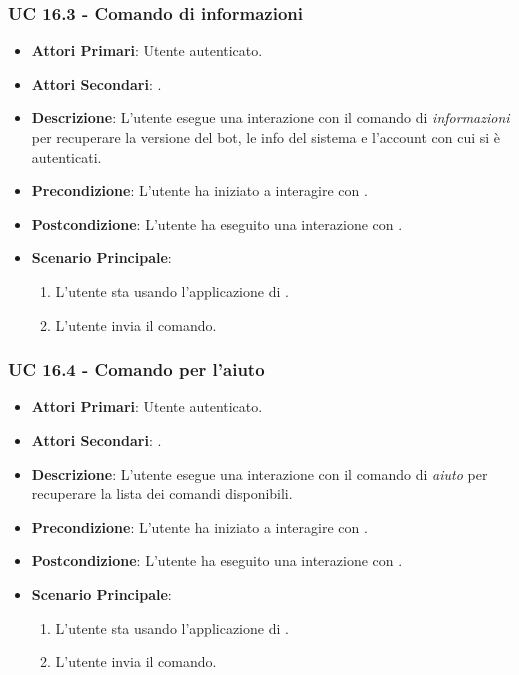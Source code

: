 	\subsubsection{UC 16.3 - Comando di informazioni}

	\begin{itemize}
		\item \textbf{Attori Primari}: Utente autenticato.
		\item \textbf{Attori Secondari}: .
		\item \textbf{Descrizione}: L'utente esegue una interazione con il comando di \textit{informazioni} per recuperare la versione del bot, le info del sistema e l'account con cui si è autenticati.
		\item \textbf{Precondizione}: L'utente ha iniziato a interagire con .
		\item \textbf{Postcondizione}: L'utente ha eseguito una interazione con .
		\item \textbf{Scenario Principale}:
		\begin{enumerate}
			\item L'utente sta usando l'applicazione di . 
			\item L'utente invia il comando.
		\end{enumerate}
	\end{itemize}



	\subsubsection{UC 16.4 - Comando per l'aiuto}


	\begin{itemize}
		\item \textbf{Attori Primari}: Utente autenticato.
		\item \textbf{Attori Secondari}: .
		\item \textbf{Descrizione}: L'utente esegue una interazione con il comando di \textit{aiuto} per recuperare la lista dei comandi disponibili.
		\item \textbf{Precondizione}: L'utente ha iniziato a interagire con .
		\item \textbf{Postcondizione}: L'utente ha eseguito una interazione con .
		\item \textbf{Scenario Principale}:
		\begin{enumerate}
			\item L'utente sta usando l'applicazione di . 
			\item L'utente invia il comando.
		\end{enumerate}
	\end{itemize}


